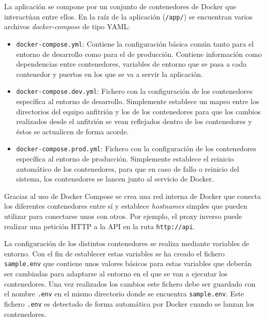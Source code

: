 La aplicación se compone por un conjunto de contenedores de Docker que
interactúan entre ellos. En la raíz de la aplicación (\texttt{/app/}) se
encuentran varios archivos \textit{docker-compose} de tipo YAML:

\begin{itemize}
    \item \texttt{docker-compose.yml}: Contiene la configuración básica común
          tanto para el entorno de desarrollo como para el de producción.
          Contiene información como dependencias entre contenedores, variables
          de entorno que se pasa a cada contenedor y puertos en los que se va a
          servir la aplicación.
    \item \texttt{docker-compose.dev.yml}: Fichero con la configuración de los
          contenedores específica al entorno de desarrollo. Simplemente
          establece un mapeo entre los directorios del equipo anfitrión y los de
          los contenedores para que los cambios realizados desde el anfitrión se
          vean reflejados dentro de los contenedores y éstos se actualicen de
          forma acorde.
    \item \texttt{docker-compose.prod.yml}: Fichero con la configuración de los
          contenedores específica al entorno de producción. Simplemente
          establece el reinicio automático de los contenedores, para que en caso
          de fallo o reinicio del sistema, los contenedores se lancen junto al
          servicio de Docker.
\end{itemize}

Gracias al uso de Docker Compose se crea una red interna de Docker que conecta
los diferentes contenedores entre sí y establece \textit{hostnames} simples
que pueden utilizar para conectarse unos con otros. Por ejemplo, el proxy
inverso puede realizar una petición HTTP a la API en la ruta
\texttt{http://api}.

La configuración de los distintos contenedores se realiza mediante variables de
entorno. Con el fin de establecer estas variables se ha creado el fichero
\texttt{sample.env} que contiene unos valores básicos para estas variables que
deberán ser cambiadas para adaptarse al entorno en el que se van a ejecutar los
contenedores. Una vez realizados los cambios este fichero debe ser guardado con
el nombre \texttt{.env} en el mismo directorio donde se encuentra
\texttt{sample.env}. Este fichero \texttt{.env} es detectado de forma automática
por Docker cuando se lanzan los contenedores.

